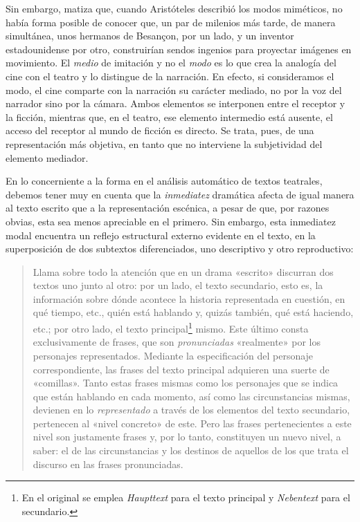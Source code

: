 Sin embargo, \citeauthor{garcia2020} matiza que, cuando Aristóteles describió los modos miméticos, no había forma posible de conocer que, un par de milenios más tarde, de manera simultánea, unos hermanos de Besançon, por un lado, y un inventor estadounidense por otro, construirían sendos ingenios para proyectar imágenes en movimiento. El \textit{medio} de imitación y no el \textit{modo} es lo que crea la analogía del cine con el teatro y lo distingue de la narración. En efecto, si consideramos el modo, el cine comparte con la narración su carácter mediado, no por la voz del narrador sino por la cámara. Ambos elementos se interponen entre el receptor y la ficción, mientras que, en el teatro, ese elemento intermedio está ausente, el acceso del receptor al mundo de ficción es directo. Se trata, pues, de una representación más objetiva, en tanto que no interviene la subjetividad del elemento mediador.

En lo concerniente a la forma en el análisis automático de textos teatrales, debemos tener muy en cuenta que la \textit{inmediatez} dramática afecta de igual manera al texto escrito que a la representación escénica, a pesar de que, por razones obvias, esta sea menos apreciable en el primero. Sin embargo, esta inmediatez modal encuentra un reflejo estructural externo evidente en el texto, en la superposición de dos subtextos diferenciados, uno descriptivo y otro reproductivo:

\blockquote{Llama sobre todo la atención que en un drama «escrito» discurran dos textos uno junto al otro: por un lado, el texto secundario, esto es, la información sobre dónde acontece la historia representada en cuestión, en qué tiempo, etc., quién está hablando y, quizás también, qué está haciendo, etc.; por otro lado, el texto principal\footnote{En el original se emplea \textit{Haupttext} para el texto principal y \textit{Nebentext} para el secundario.} mismo. Este último consta exclusivamente de frases, que son \textit{pronunciadas} «realmente» por los personajes representados. Mediante la especificación del personaje correspondiente, las frases del texto principal adquieren una suerte de «comillas». Tanto estas frases mismas como los personajes que se indica que están hablando en cada momento, así como las circunstancias mismas, devienen en lo \textit{representado} a través de los elementos del texto secundario, pertenecen al «nivel concreto» de este. Pero las frases pertenecientes a este nivel son justamente frases y, por lo tanto, constituyen un nuevo nivel, a saber: el de las circunstancias y los destinos de aquellos de los que trata el discurso en las frases pronunciadas. \parencite[p. 220; traducción propia; énfasis en el el original]{ingarden1972}} 

